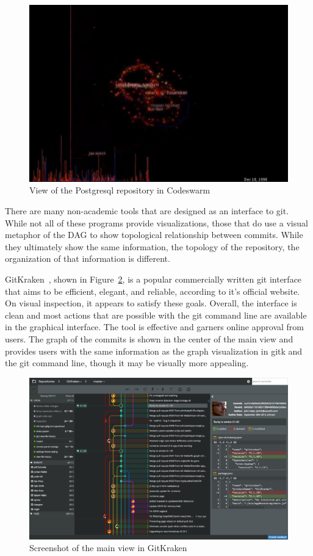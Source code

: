 \begin{figure}[htpb]
  \centering
  \includegraphics[width=0.8\linewidth]{Figures/introduction/codeswarm.png}
  \caption{View of the Postgresql repository in Codeswarm\cite{ogawa09}}
  \label{fig:codeswarm}
\end{figure}

There are many non-academic tools that are designed as an interface to
git.
While not all of these programs provide visualizations, those that
do use a visual metaphor of the DAG to show topological relationship
between commits.
While they ultimately show the same information, the topology of the
repository, the organization of that information is different.

GitKraken~\cite{gitkraken},
shown in Figure~\ref{fig:gitkraken_main}, is a popular
commercially written git interface that aims to be efficient, elegant,
and reliable, according to it's official website.
On visual inspection, it appears to satisfy these goals.
Overall, the interface is clean and most actions that are possible with
the git command line are available in the graphical interface.
The tool is effective and garners online approval from users.
The graph of the commits is shown in the center of the main view and
provides users with the same information as the graph visualization in
gitk and the git command line, though it may be visually more appealing.

\begin{figure}[htpb]
  \centering
  \includegraphics[width=0.8\linewidth]{Figures/introduction/gitkraken_main.png}
  \caption{Screenshot of the main view in GitKraken\cite{gitkraken}}
  \label{fig:gitkraken_main}
\end{figure}

